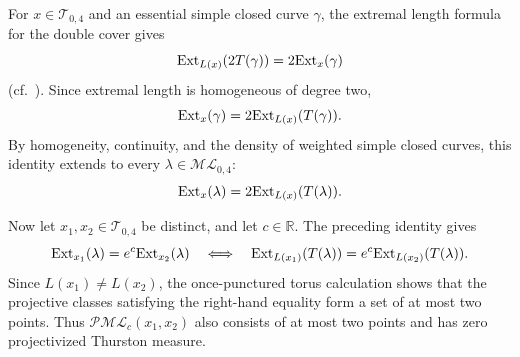 \documentclass[dvipdfmx]{amsart}
\theoremstyle{remark}
\newcommand{\ext}{{\rm Ext}}
\newcommand{\teich}{\mathcal{T}}
\newcommand{\ml}{\mathcal{ML}}
\newcommand{\pml}{\mathcal{PML}}
\begin{document}
For $x\in\teich_{0,4}$ and an essential simple
closed curve $\gamma$, the extremal length
formula for the double cover gives
\[
\ext_{L(x)}(2T(\gamma))=2\ext_x(\gamma)
\]
(cf.\ \cite[Lemma 4.1 and \S4]
{FortierBourqueEtAl2024}).
Since extremal length is homogeneous of degree two,
\[
\ext_x(\gamma)=2\ext_{L(x)}(T(\gamma)).
\]
By homogeneity, continuity, and the density of
weighted simple closed curves, this identity
extends to every $\lambda\in\ml_{0,4}$:
\[
\ext_x(\lambda)=2\ext_{L(x)}(T(\lambda)).
\]

Now let $x_1,x_2\in\teich_{0,4}$ be distinct,
and let $c\in\mathbb R$.
The preceding identity gives
\[
\ext_{x_1}(\lambda)=e^c\ext_{x_2}(\lambda)
\quad\Longleftrightarrow\quad
\ext_{L(x_1)}(T(\lambda))
=e^c\ext_{L(x_2)}(T(\lambda)).
\]
Since $L(x_1)\ne L(x_2)$, the once-punctured
torus calculation shows that the projective
classes satisfying the right-hand equality
form a set of at most two points.
Thus $\pml_c(x_1,x_2)$ also consists of at most
two points and has zero projectivized Thurston
measure.
\end{document}
